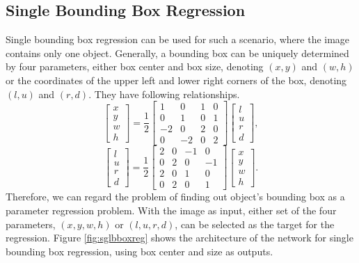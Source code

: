 \subsection{Single Bounding Box Regression}\label{sglbboxreg}
Single bounding box regression can be used for such a scenario, where the image contains only one object. Generally, a bounding box can be uniquely determined by four parameters, either box center and box size, denoting $(x, y)$ and $(w, h)$ or the coordinates of the upper left and lower right corners of the box, denoting $(l, u)$ and $(r, d)$. They have following relationships.
\begin{equation}
	\left[\begin{array}{c}
		x\\y\\w\\h
	\end{array}\right]=\frac{1}{2}\left[\begin{array}{cccc}
		1 & 0 & 1 & 0 \\
		0 & 1 & 0 & 1 \\
		-2 & 0 & 2 & 0 \\
		0 & -2 & 0 & 2
	\end{array}\right]\left[\begin{array}{c}
		l\\u\\r\\d
	\end{array}\right],
\end{equation}
\begin{equation}
	\left[\begin{array}{c}
		l\\u\\r\\d
	\end{array}\right]=\frac{1}{2}\left[\begin{array}{cccc}
		2 & 0 & -1 & 0 \\
		0 & 2 & 0 & -1 \\
		2 & 0 & 1 & 0 \\
		0 & 2 & 0 & 1
	\end{array}\right]\left[\begin{array}{c}
		x\\y\\w\\h
	\end{array}\right].
\end{equation}
Therefore, we can regard the problem of finding out object's bounding box as a parameter regression problem. With the image as input, either set of the four parameters, $(x, y, w, h)$ or $(l, u, r, d)$, can be selected as the target for the regression. Figure \ref{fig:sglbboxreg} shows the architecture of the network for single bounding box regression, using box center and size as outputs.

